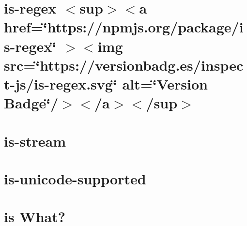 \documentclass[twoside]{book}
\newcommand{\+}{\discretionary{\mbox{\scriptsize$\hookleftarrow$}}{}{}}
\begin{document}
\chapter{is-\/regex \texorpdfstring{$<$}{<}sup\texorpdfstring{$>$}{>}\texorpdfstring{$<$}{<}a href=\char`\"{}https\+://npmjs.\+org/package/is-\/regex\char`\"{} \texorpdfstring{$>$}{>}\texorpdfstring{$<$}{<}img src=\char`\"{}https\+://versionbadg.\+es/inspect-\/js/is-\/regex.\+svg\char`\"{} alt=\char`\"{}\+Version Badge\char`\"{}/\texorpdfstring{$>$}{>}\texorpdfstring{$<$}{<}/a\texorpdfstring{$>$}{>}\texorpdfstring{$<$}{<}/sup\texorpdfstring{$>$}{>}}
\label{md__c___users_vaishnavi_jadhav__desktop__developer_code_mean_stack_example_client_node_modules_is_regex__r_e_a_d_m_e}

\chapter{is-\/stream}
\label{md__c___users_vaishnavi_jadhav__desktop__developer_code_mean_stack_example_client_node_modules_is_stream_readme}

\chapter{is-\/unicode-\/supported}
\label{md__c___users_vaishnavi_jadhav__desktop__developer_code_mean_stack_example_client_node_modules_is_unicode_supported_readme}

\chapter{is What? 🙉}
\label{md__c___users_vaishnavi_jadhav__desktop__developer_code_mean_stack_example_client_node_modules_is_what__r_e_a_d_m_e}

\end{document}
